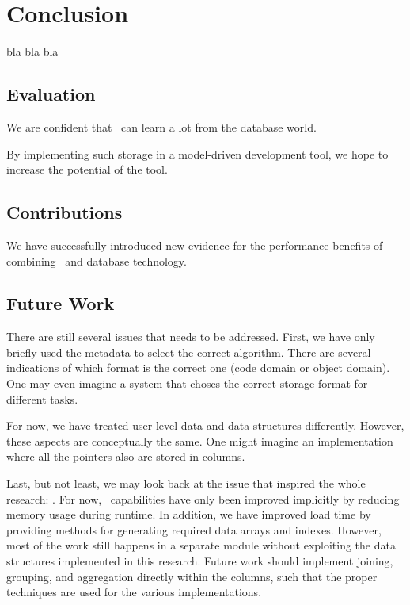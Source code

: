 \chapter{Conclusion}
\label{chap:Conclusion}
bla bla bla

\section{Evaluation}
\label{sec:Evaluation}
We are confident that \mdd~can learn a lot from the database world.

By implementing such storage in a model-driven development tool, we hope to increase the potential of the tool.

\section{Contributions}
\label{sec:Contributions}
We have successfully introduced new evidence for the performance benefits of combining \mdd~and database technology.

\section{Future Work}
\label{sec:Future Work}
There are still several issues that needs to be addressed. First, we have only briefly used the metadata to select the correct algorithm. There are several indications of which format is the correct one (code domain or object domain). One may even imagine a system that choses the correct storage format for different tasks.

For now, we have treated user level data and data structures differently. However, these aspects are conceptually the same. One might imagine an implementation where all the pointers also are stored in columns.

Last, but not least, we may look back at the issue that inspired the whole research: \bd. For now, \bd~capabilities have only been improved implicitly by reducing memory usage during runtime. In addition, we have improved load time by providing methods for generating required data arrays and indexes. However, most of the work still happens in a separate module without exploiting the data structures implemented in this research. Future work should implement joining, grouping, and aggregation directly within the columns, such that the proper techniques are used for the various implementations.
